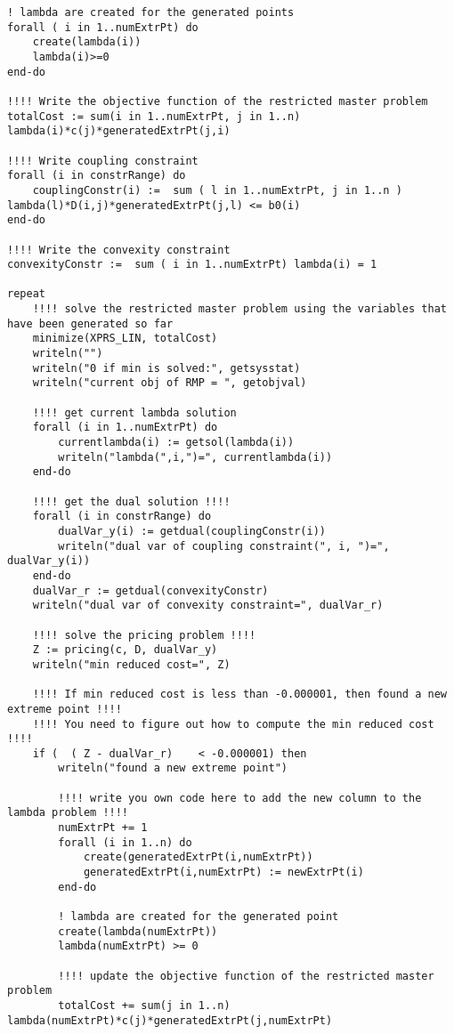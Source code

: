 \documentclass[twoside,12pt]{article}
\begin{document}
\begin{verbatim}
! lambda are created for the generated points
forall ( i in 1..numExtrPt) do
	create(lambda(i))
	lambda(i)>=0
end-do

!!!! Write the objective function of the restricted master problem
totalCost := sum(i in 1..numExtrPt, j in 1..n) lambda(i)*c(j)*generatedExtrPt(j,i)

!!!! Write coupling constraint
forall (i in constrRange) do
	couplingConstr(i) :=  sum ( l in 1..numExtrPt, j in 1..n ) lambda(l)*D(i,j)*generatedExtrPt(j,l) <= b0(i)
end-do

!!!! Write the convexity constraint
convexityConstr :=  sum ( i in 1..numExtrPt) lambda(i) = 1

repeat 
	!!!! solve the restricted master problem using the variables that have been generated so far
	minimize(XPRS_LIN, totalCost)
	writeln("")
    writeln("0 if min is solved:", getsysstat)
    writeln("current obj of RMP = ", getobjval)
    
    !!!! get current lambda solution
    forall (i in 1..numExtrPt) do
    	currentlambda(i) := getsol(lambda(i))
    	writeln("lambda(",i,")=", currentlambda(i))
    end-do
    
    !!!! get the dual solution !!!!
    forall (i in constrRange) do
    	dualVar_y(i) := getdual(couplingConstr(i))
    	writeln("dual var of coupling constraint(", i, ")=", dualVar_y(i))
    end-do
    dualVar_r := getdual(convexityConstr)
    writeln("dual var of convexity constraint=", dualVar_r)
    
    !!!! solve the pricing problem !!!!
    Z := pricing(c, D, dualVar_y)
    writeln("min reduced cost=", Z)
    
    !!!! If min reduced cost is less than -0.000001, then found a new extreme point !!!!
    !!!! You need to figure out how to compute the min reduced cost !!!!
    if (  ( Z - dualVar_r)    < -0.000001) then
    	writeln("found a new extreme point")
    	
    	!!!! write you own code here to add the new column to the lambda problem !!!!
    	numExtrPt += 1
    	forall (i in 1..n) do
    		create(generatedExtrPt(i,numExtrPt))
    		generatedExtrPt(i,numExtrPt) := newExtrPt(i)
    	end-do
 
     	! lambda are created for the generated point   	
    	create(lambda(numExtrPt))
    	lambda(numExtrPt) >= 0

    	!!!! update the objective function of the restricted master problem
		totalCost += sum(j in 1..n) lambda(numExtrPt)*c(j)*generatedExtrPt(j,numExtrPt)


\end{verbatim}
\end{document}
